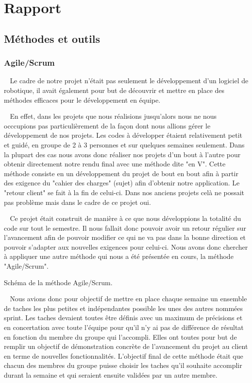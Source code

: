 \documentclass[12pt]{article}
\def\tab{$\>\>\>\>$}
\begin{document}
\newpage
\section{Rapport}
\subsection{Méthodes et outils}
\subsubsection{Agile/Scrum}
\tab Le cadre de notre projet n'était pas seulement le développement d'un logiciel de robotique, il avait également pour but de découvrir et mettre en place des méthodes efficaces pour le développement en équipe.

\tab En effet, dans les projets que nous réalisions jusqu'alors nous ne nous occcupions pas particulièrement de la façon dont nous allions gérer le développement de nos projets. Les codes à développer étaient relativement petit et guidé, en groupe de 2 à 3 personnes et sur quelques semaines seulement. Dans la plupart des cas nous avons donc réaliser nos projets d'un bout à l'autre pour obtenir directement notre rendu final avec une méthode dite "en V". Cette méthode consiste en un développement du projet de bout en bout afin à partir des exigence du "cahier des charges" (sujet) afin d'obtenir notre application. Le "retour client" se fait à la fin de celui-ci. Dans nos anciens projets celà ne possait pas problème mais dans le cadre de ce projet oui.

\tab Ce projet était construit de manière à ce que nous développions la totalité du code sur tout le semestre. Il nous fallait donc pouvoir avoir un retour régulier sur l'avancement afin de pouvoir modifier ce qui ne va pas dans la bonne direction et pouvoir s'adapter aux nouvelles exigences pour celui-ci. Nous avons donc chercher à appliquer une autre méthode qui nous a été présentée en cours, la méthode "Agile/Scrum".

\begin{center}



Schéma de la méthode Agile/Scrum.




\end{center}

\tab Nous avions donc pour objectif de mettre en place chaque semaine un ensemble de taches les plus petites et indépendantes possible les unes des autres nommées sprint. Les taches devaient toutes être définis avec un maximum de précisions et en concertation avec toute l'équipe pour qu'il n'y ai pas de différence de résultat en fonction du membre du groupe qui l'accompli. Elles ont toutes pour but de remplir un objectif de démonstration concrète de l'avancement du projet au client en terme de nouvelles fonctionnalités. L'objectif final de cette méthode était que chacun des membres du groupe puisse choisir les taches qu'il souhaite accomplir durant la semaine et qui seraient ensuite validées par un autre membre.
\end{document}
